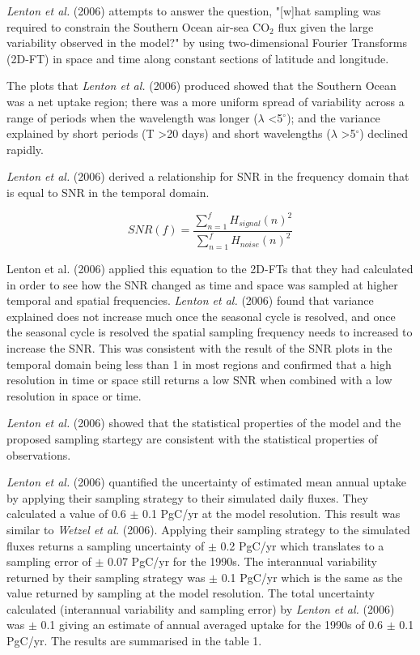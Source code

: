 \documentclass[11pt, a4paper]{article}
\numberwithin{figure}{section}
\numberwithin{table}{section}
\begin{document}
\emph{Lenton et al.} (2006) attempts to answer the question, "[w]hat sampling was required to 
constrain the Southern Ocean air-sea CO$_2$ flux given the large variability observed 
in the model?" by using two-dimensional Fourier Transforms (2D-FT) in space and time along
constant sections of latitude and longitude.

The plots that \emph{Lenton et al.} (2006) produced showed that the Southern Ocean 
was a net uptake region; there was a more uniform
spread of variability across a range of periods when the wavelength was longer 
({$\lambda$ \textless 5$^\circ$}); 
and the variance explained by short periods
(T \textgreater 20 days) and short wavelengths 
({$\lambda$ \textgreater 5$^\circ$}) declined rapidly.

\emph{Lenton et al.} (2006) derived a relationship for SNR in the frequency domain
that is equal to SNR in the temporal domain.

\begin{equation}
SNR(f) = \frac{\sum_{n=1}^{f} H_{signal}(n)^2}{\sum_{n=1}^{f} H_{noise}(n)^2}
\end{equation}

Lenton et al. (2006)  applied this equation to the 2D-FTs that
they had calculated in order to see how the SNR
changed as time and space was sampled at higher temporal and spatial 
frequencies. 
\emph{Lenton et al.} (2006) found that variance explained does 
not increase much once the seasonal cycle is resolved, and 
once the seasonal cycle is resolved the spatial sampling 
frequency needs to increased to increase the SNR. 
This was consistent with the result of the SNR plots in the temporal domain 
being less than 1 in most regions and 
confirmed that a high resolution in time or space still returns a low SNR when 
combined with a low resolution in space or time.

\emph{Lenton et al.} (2006) showed that the statistical properties of 
the model and the proposed sampling startegy are consistent with the 
statistical properties of observations.

\emph{Lenton et al.} (2006) quantified the uncertainty of estimated mean annual uptake
by applying their sampling strategy to their simulated daily fluxes. 
They calculated a value of 0.6 $\pm$ 0.1 PgC/yr at the model resolution. 
This result was similar to \emph{Wetzel et al.} (2006). 
Applying their sampling strategy to the simulated fluxes 
returns a sampling uncertainty of $\pm$ 0.2 PgC/yr which translates to a sampling
error of $\pm$ 0.07 PgC/yr for the 1990s. 
The interannual variability returned by their
sampling strategy was $\pm$ 0.1 PgC/yr which is the same as the value returned
by sampling at the model resolution. 
The total uncertainty calculated 
(interannual variability and sampling error) by  \emph{Lenton et al.} (2006) was
$\pm$ 0.1 giving an estimate of annual averaged uptake for the 1990s of 0.6
$\pm$ 0.1 PgC/yr. The results are summarised in the table 1.
\end{document}
